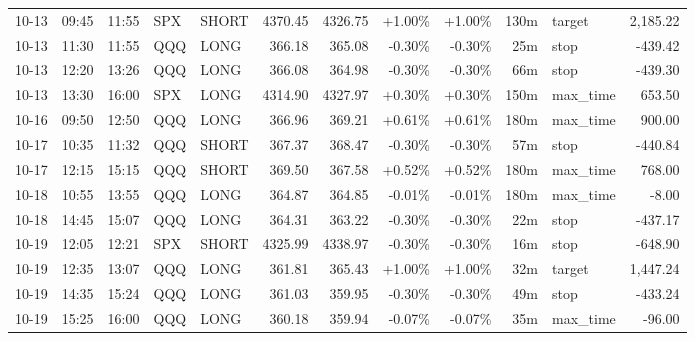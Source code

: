 \documentclass[11pt,a4paper]{article}
\begin{document}
\begin{center}
\begin{longtable}{>{\color{txtmain}}l l l l l r r r r r >{\color{txtmain}}l r}
10-13 & 09:45 & 11:55 & SPX & SHORT & 4370.45 & 4326.75 & \textcolor{wingreen}{+1.00\%} & \textcolor{wingreen}{+1.00\%} & 130m & target & \textcolor{wingreen}{2,185.22} \\
10-13 & 11:30 & 11:55 & QQQ & LONG & 366.18 & 365.08 & \textcolor{lossred}{-0.30\%} & \textcolor{lossred}{-0.30\%} & 25m & stop & \textcolor{lossred}{-439.42} \\
10-13 & 12:20 & 13:26 & QQQ & LONG & 366.08 & 364.98 & \textcolor{lossred}{-0.30\%} & \textcolor{lossred}{-0.30\%} & 66m & stop & \textcolor{lossred}{-439.30} \\
10-13 & 13:30 & 16:00 & SPX & LONG & 4314.90 & 4327.97 & \textcolor{wingreen}{+0.30\%} & \textcolor{wingreen}{+0.30\%} & 150m & max\_time & \textcolor{wingreen}{653.50} \\
10-16 & 09:50 & 12:50 & QQQ & LONG & 366.96 & 369.21 & \textcolor{wingreen}{+0.61\%} & \textcolor{wingreen}{+0.61\%} & 180m & max\_time & \textcolor{wingreen}{900.00} \\
10-17 & 10:35 & 11:32 & QQQ & SHORT & 367.37 & 368.47 & \textcolor{lossred}{-0.30\%} & \textcolor{lossred}{-0.30\%} & 57m & stop & \textcolor{lossred}{-440.84} \\
10-17 & 12:15 & 15:15 & QQQ & SHORT & 369.50 & 367.58 & \textcolor{wingreen}{+0.52\%} & \textcolor{wingreen}{+0.52\%} & 180m & max\_time & \textcolor{wingreen}{768.00} \\
10-18 & 10:55 & 13:55 & QQQ & LONG & 364.87 & 364.85 & \textcolor{lossred}{-0.01\%} & \textcolor{lossred}{-0.01\%} & 180m & max\_time & \textcolor{lossred}{-8.00} \\
10-18 & 14:45 & 15:07 & QQQ & LONG & 364.31 & 363.22 & \textcolor{lossred}{-0.30\%} & \textcolor{lossred}{-0.30\%} & 22m & stop & \textcolor{lossred}{-437.17} \\
10-19 & 12:05 & 12:21 & SPX & SHORT & 4325.99 & 4338.97 & \textcolor{lossred}{-0.30\%} & \textcolor{lossred}{-0.30\%} & 16m & stop & \textcolor{lossred}{-648.90} \\
10-19 & 12:35 & 13:07 & QQQ & LONG & 361.81 & 365.43 & \textcolor{wingreen}{+1.00\%} & \textcolor{wingreen}{+1.00\%} & 32m & target & \textcolor{wingreen}{1,447.24} \\
10-19 & 14:35 & 15:24 & QQQ & LONG & 361.03 & 359.95 & \textcolor{lossred}{-0.30\%} & \textcolor{lossred}{-0.30\%} & 49m & stop & \textcolor{lossred}{-433.24} \\
10-19 & 15:25 & 16:00 & QQQ & LONG & 360.18 & 359.94 & \textcolor{lossred}{-0.07\%} & \textcolor{lossred}{-0.07\%} & 35m & max\_time & \textcolor{lossred}{-96.00} \\

\end{longtable}
\end{center}
\end{document}
